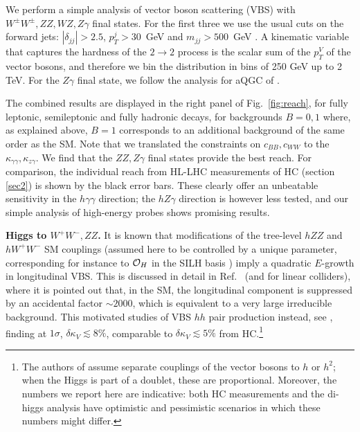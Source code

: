 We perform a simple analysis of vector boson scattering (VBS) with $W^\pm W^\pm, ZZ, WZ,Z\gamma$ final states. For the first three we use the usual cuts on the forward jets: $|\delta_{jj}|>2.5$, $p_T^j>30$~GeV and $m_{jj}>500$~GeV \cite{Aad:2014zda}. A kinematic variable that captures the hardness of the $2\to 2$ process is the scalar sum of the $p_T^V$ of the vector bosons, and therefore we bin the distribution in bins of 250 GeV up to 2 TeV. For the $Z\gamma$ final state, we follow the analysis for aQGC of \cite{Aaboud:2017pds}.

The combined results are displayed in the right panel of Fig.~\ref{fig:reach}, for fully leptonic, semileptonic and fully hadronic decays, for backgrounds  $B=0,1$ where, as explained above, $B=1$ corresponds to an additional background of the same order as the SM. Note that we translated the constraints on $c_{BB},c_{WW}$ to the $\kappa_{\gamma\gamma},\kappa_{z\gamma}$. We find that the $ZZ,Z\gamma$ final states provide the best reach.
For comparison, the individual reach from HL-LHC measurements of HC (section \ref{sec2}) is shown by the black error bars. These clearly offer an unbeatable sensitivity in the $h\gamma\gamma$ direction; the $hZ\gamma$ direction is however less tested, and our simple analysis of high-energy probes shows promising results.



\vspace{5mm}
\noindent
{\bf Higgs to $W^+W^-,ZZ$.}
It is  known that modifications of the tree-level $hZZ$ and $hW^+W^-$ SM couplings (assumed here to be controlled by a unique parameter, corresponding for instance to $\mathcal{O}_H$ in the SILH basis \cite{Giudice:2007fh}) imply a quadratic $E$-growth in longitudinal VBS. This is discussed in detail in Ref.~\cite{Contino:2010mh} (and \cite{Contino:2013gna} for linear colliders), where it is pointed out that, in the SM, the longitudinal component is suppressed by an accidental factor $\sim 2000$, which is equivalent to a very large irreducible background. This motivated studies of VBS $hh$ pair production instead, see \cite{Bishara:2016kjn}, finding at $1\sigma$, $\delta\kappa_V\lesssim 8\%$, comparable to $\delta\kappa_V\lesssim 5\%$ from HC.\footnote{The authors of \cite{Bishara:2016kjn} assume separate couplings of the vector bosons to $h$ or $h^2$; when the Higgs is part of a doublet, these are proportional. Moreover, the numbers we report here are indicative: both HC measurements and the di-higgs analysis have  optimistic and pessimistic scenarios in which these numbers might differ.}




